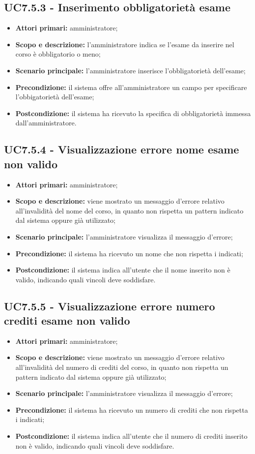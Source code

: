 \documentclass[AnalisiDeiRequisiti.tex]{subfiles}
\begin{document}
\subsection{UC7.5.3 - Inserimento obbligatorietà esame}
\begin{itemize}
	\item \textbf{Attori primari:} amministratore;
	\item \textbf{Scopo e descrizione:} l'amministratore indica se l'esame da inserire nel corso è obbligatorio o meno;
	\item \textbf{Scenario principale:} l'amministratore inserisce l'obbligatorietà dell'esame;
	\item \textbf{Precondizione:} il sistema offre all'amministratore un campo per specificare l'obbigatorietà dell'esame; 
	\item \textbf{Postcondizione:} il sistema ha ricevuto la specifica di obbligatorietà immessa dall'amministratore.
\end{itemize}
\subsection{UC7.5.4 - Visualizzazione errore nome esame non valido}
\begin{itemize}
	\item \textbf{Attori primari:} amministratore;
	\item \textbf{Scopo e descrizione:} viene mostrato un messaggio d'errore relativo all'invalidità del nome del corso, in quanto non rispetta un pattern indicato dal sistema oppure già utilizzato;
	\item \textbf{Scenario principale:} l'amministratore visualizza il messaggio d'errore;
	\item \textbf{Precondizione:} il sistema ha ricevuto un nome che non rispetta i  indicati; 
	\item \textbf{Postcondizione:} il sistema indica all'utente che il nome inserito non è valido, indicando quali vincoli deve soddisfare.
\end{itemize}
\subsection{UC7.5.5 - Visualizzazione errore numero crediti esame non valido}
\begin{itemize}
	\item \textbf{Attori primari:} amministratore;
	\item \textbf{Scopo e descrizione:} viene mostrato un messaggio d'errore relativo all'invalidità del numero di crediti del corso, in quanto non rispetta un pattern indicato dal sistema oppure già utilizzato;
	\item \textbf{Scenario principale:} l'amministratore visualizza il messaggio d'errore;
	\item \textbf{Precondizione:} il sistema ha ricevuto un numero di crediti che non rispetta i  indicati; 
	\item \textbf{Postcondizione:} il sistema indica all'utente che il numero di crediti inserito non è valido, indicando quali vincoli deve soddisfare.
\end{itemize}
\end{document}
